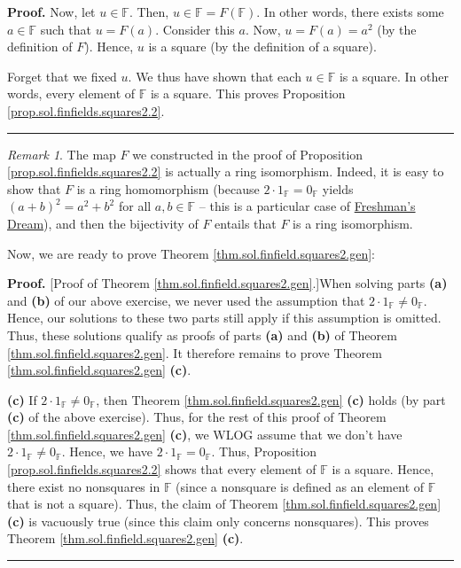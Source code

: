 \documentclass[paper=a4, fontsize=12pt]{scrartcl}%
\theoremstyle{plainsl}
\theoremstyle{definition}
\theoremstyle{remark}
\newtheorem{remark}[theorem]{Remark}
\newenvironment{proof}[1][Proof]{\noindent\textbf{#1.} }{\ \rule{0.5em}{0.5em}}
\begin{document}
\begin{proof}
Now, let $u\in\mathbb{F}$. Then, $u\in\mathbb{F}=F\left(  \mathbb{F}\right)
$. In other words, there exists some $a\in\mathbb{F}$ such that $u=F\left(
a\right)  $. Consider this $a$. Now, $u=F\left(  a\right)  =a^{2}$ (by the
definition of $F$). Hence, $u$ is a square (by the definition of a square).

Forget that we fixed $u$. We thus have shown that each $u\in\mathbb{F}$ is a
square. In other words, every element of $\mathbb{F}$ is a square. This proves
Proposition \ref{prop.sol.finfields.squares2.2}.
\end{proof}

\begin{remark}
The map $F$ we constructed in the proof of Proposition
\ref{prop.sol.finfields.squares2.2} is actually a ring isomorphism. Indeed, it
is easy to show that $F$ is a ring homomorphism (because $2\cdot1_{\mathbb{F}%
}=0_{\mathbb{F}}$ yields $\left(  a+b\right)  ^{2}=a^{2}+b^{2}$ for all
$a,b\in\mathbb{F}$ -- this is a particular case of
\href{https://en.wikipedia.org/wiki/Freshman's_dream#Prime_characteristic}{Freshman's
Dream}), and then the bijectivity of $F$ entails that $F$ is a ring isomorphism.
\end{remark}

Now, we are ready to prove Theorem \ref{thm.sol.finfield.squares2.gen}:

\begin{proof}
[Proof of Theorem \ref{thm.sol.finfield.squares2.gen}.]When solving parts
\textbf{(a)} and \textbf{(b)} of our above exercise, we never used the
assumption that $2\cdot1_{\mathbb{F}}\neq0_{\mathbb{F}}$. Hence, our solutions
to these two parts still apply if this assumption is omitted. Thus, these
solutions qualify as proofs of parts \textbf{(a)} and \textbf{(b)} of Theorem
\ref{thm.sol.finfield.squares2.gen}. It therefore remains to prove Theorem
\ref{thm.sol.finfield.squares2.gen} \textbf{(c)}.

\textbf{(c)} If $2\cdot1_{\mathbb{F}}\neq0_{\mathbb{F}}$, then Theorem
\ref{thm.sol.finfield.squares2.gen} \textbf{(c)} holds (by part \textbf{(c)}
of the above exercise). Thus, for the rest of this proof of Theorem
\ref{thm.sol.finfield.squares2.gen} \textbf{(c)}, we WLOG assume that we don't
have $2\cdot1_{\mathbb{F}}\neq0_{\mathbb{F}}$. Hence, we have $2\cdot
1_{\mathbb{F}}=0_{\mathbb{F}}$. Thus, Proposition
\ref{prop.sol.finfields.squares2.2} shows that every element of $\mathbb{F}$
is a square. Hence, there exist no nonsquares in $\mathbb{F}$ (since a
nonsquare is defined as an element of $\mathbb{F}$ that is not a square).
Thus, the claim of Theorem \ref{thm.sol.finfield.squares2.gen} \textbf{(c)} is
vacuously true (since this claim only concerns nonsquares). This proves
Theorem \ref{thm.sol.finfield.squares2.gen} \textbf{(c)}.
\end{proof}
\end{document}

